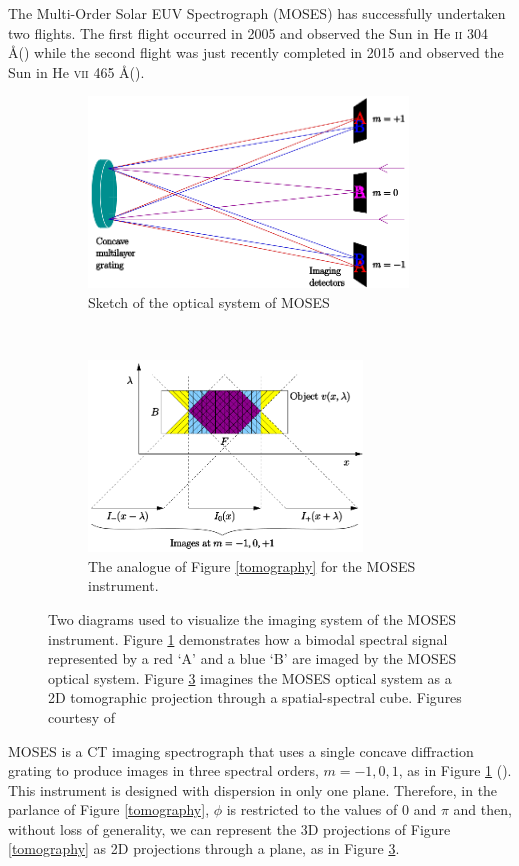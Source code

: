 \documentclass[10pt, letter]{article}
\begin{document}
				The Multi-Order Solar EUV Spectrograph (MOSES) has successfully undertaken two flights. The first flight occurred in 2005 and observed the Sun in He \textsc{ii} 304 \AA (\cite{fox1}) while the second flight was just recently completed in 2015 and observed the Sun in He \textsc{vii} 465 \AA (\cite{smart1}). 			
				 		
				\begin{figure}[h!]
					\centering
					\begin{subfigure}[t]{0.49\textwidth}
						\centering
						\includegraphics[height=2in]{figures/concave}
						\caption{Sketch of the optical system of MOSES}
						\label{optics}
					\end{subfigure}	
					~
					\begin{subfigure}[t]{0.49\textwidth}
						\centering
						\includegraphics[height=2in]{figures/moses_cube}
						\caption{The analogue of Figure \ref{tomography} for the MOSES instrument.}
						\label{moses_tomo}
					\end{subfigure}	
					\caption{Two diagrams used to visualize the imaging system of the MOSES instrument. Figure \ref{optics} demonstrates how a bimodal spectral signal represented by a red `A' and a blue `B' are imaged by the MOSES optical system. Figure \ref{moses_tomo} imagines the MOSES optical system as a 2D tomographic projection through a spatial-spectral cube. Figures courtesy of \cite{fox1}}
				\end{figure}
				MOSES is a CT imaging spectrograph that uses a single concave diffraction grating to produce images in three spectral orders, $m=-1,0,1$, as in Figure \ref{optics} (\cite{kankel1}).
				This instrument is designed with dispersion in only one plane. Therefore, in the parlance of Figure \ref{tomography}, $\phi$ is restricted to the values of 0 and $\pi$ and then, without loss of generality, we can represent the 3D projections of Figure \ref{tomography} as 2D projections through a plane, as in Figure \ref{moses_tomo}.
				
\end{document}
